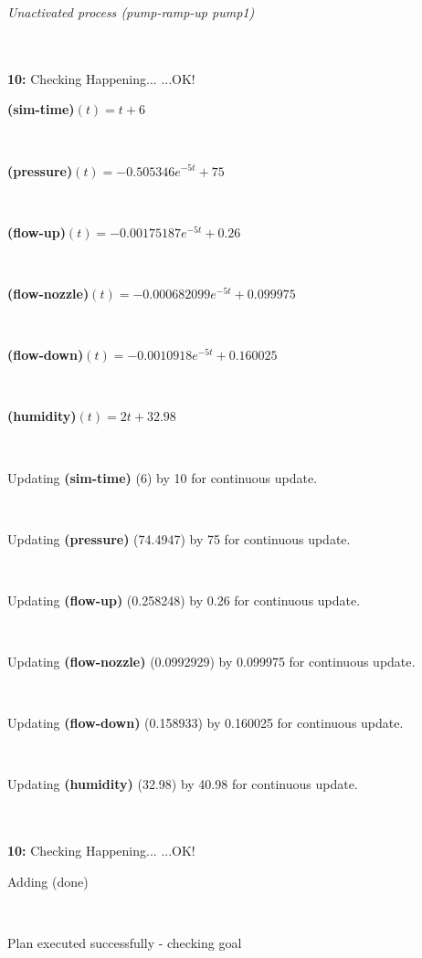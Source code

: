 \documentclass[a4paper,12pt]{article}
\newcommand{\atime}[1]{{\bf #1:}}
\newcommand{\action}[1]{{\sf #1}}
\newcommand{\exprn}[1]{{\sf #1}}
\newcommand{\fexprn}[1]{{\small {\bf #1}}}
\newcommand{\checkhappening}{Checking Happening... }
\newcommand{\listrow}[1]{\begin{minipage}[t]{11.5cm} #1 \end{minipage}}
\newcommand{\happeningOK}{...OK!}
\newcommand{\aprocessunactivated}[1]{\listrow{{\it Unactivated process #1} }}
\newcommand{\assignmentcts}[3]{\listrow{Updating \fexprn{#1} (#2) by #3 for continuous update.}}
\newcommand{\function}[2]{\listrow{\fexprn{#1}$(t) = #2$}}
\newcommand{\adding}[1]{\listrow{Adding \exprn{#1} }}
\begin{document}
\begin{tabbing}
\> \aprocessunactivated{\action{(pump-ramp-up pump1)}}\\
\\
\atime{10} \> \checkhappening\happeningOK\\
 \> \function{(sim-time)}{t + 6}\\
 \> \function{(pressure)}{-0.505346e^{ - 5t} + 75}\\
 \> \function{(flow-up)}{-0.00175187e^{ - 5t} + 0.26}\\
 \> \function{(flow-nozzle)}{-0.000682099e^{ - 5t} + 0.099975}\\
 \> \function{(flow-down)}{-0.0010918e^{ - 5t} + 0.160025}\\
 \> \function{(humidity)}{2t + 32.98}\\
 \> \assignmentcts{(sim-time)}{6}{10}\\
 \> \assignmentcts{(pressure)}{74.4947}{75}\\
 \> \assignmentcts{(flow-up)}{0.258248}{0.26}\\
 \> \assignmentcts{(flow-nozzle)}{0.0992929}{0.099975}\\
 \> \assignmentcts{(flow-down)}{0.158933}{0.160025}\\
 \> \assignmentcts{(humidity)}{32.98}{40.98}\\
\\
\atime{10} \> \checkhappening\happeningOK\\
 \> \adding{(done)}\\
\end{tabbing}
Plan executed successfully - checking goal\\
\\
\end{document}
